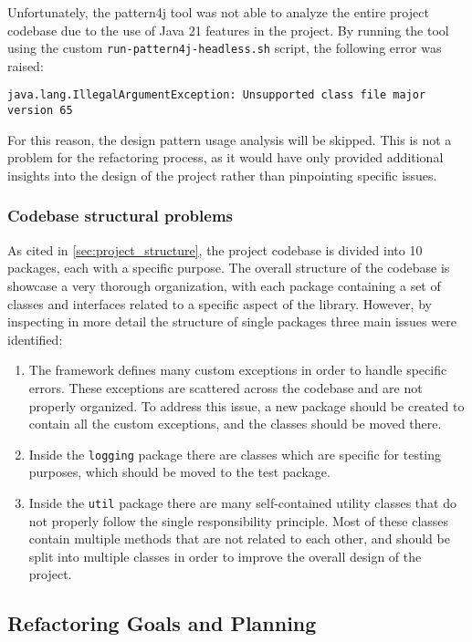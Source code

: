 Unfortunately, the pattern4j tool was not able to analyze the entire project codebase due to the use of Java 21 features in the project. By running the tool using the custom \texttt{run-pattern4j-headless.sh} script, the following error was raised:

\begin{verbatim}
java.lang.IllegalArgumentException: Unsupported class file major version 65
\end{verbatim}

\noindent For this reason, the design pattern usage analysis will be skipped. This is not a problem for the refactoring process, as it would have only provided additional insights into the design of the project rather than pinpointing specific issues.

\subsubsection{Codebase structural problems}

As cited in \autoref{sec:project_structure}, the project codebase is divided into 10 packages, each with a specific purpose. The overall structure of the codebase is showcase a very thorough organization, with each package containing a set of classes and interfaces related to a specific aspect of the library. However, by inspecting in more detail the structure of single packages three main issues were identified:

\begin{enumerate}
	\item The framework defines many custom exceptions in order to handle specific errors. These exceptions are scattered across the codebase and are not properly organized. To address this issue, a new package should be created to contain all the custom exceptions, and the classes should be moved there.
	\item Inside the \texttt{logging} package there are classes which are specific for testing purposes, which should be moved to the test package.
	\item Inside the \texttt{util} package there are many self-contained utility classes that do not properly follow the single responsibility principle. Most of these classes contain multiple methods that are not related to each other, and should be split into multiple classes in order to improve the overall design of the project.
\end{enumerate}

\subsection{Refactoring Goals and Planning}
\label{sec:refactoring_plan}

